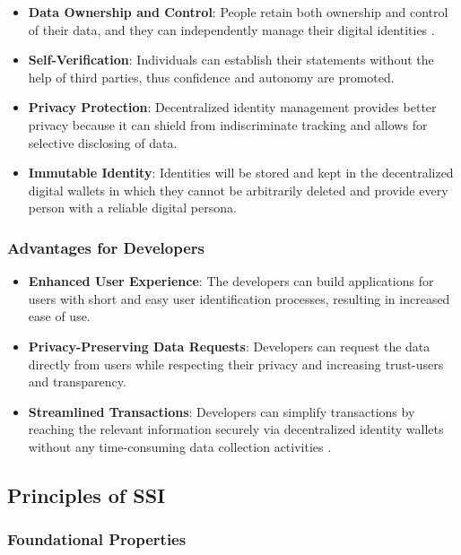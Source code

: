 \begin{itemize}
    \item \textbf{Data Ownership and Control}: People retain both ownership and control of their data, and they can independently manage their digital identities \cite{dockio}.
    \item \textbf{Self-Verification}: Individuals can establish their statements without the help of third parties, thus confidence and autonomy are promoted.
    \item \textbf{Privacy Protection}: Decentralized identity management provides better privacy because it can shield from indiscriminate tracking and allows for selective 
    disclosing of data.
    \item \textbf{Immutable Identity}: Identities will be stored and kept in the decentralized digital wallets in which they cannot be arbitrarily deleted and provide every 
    person with a reliable digital persona.
\end{itemize}

\subsubsection{Advantages for Developers}

\begin{itemize}
    \item \textbf{Enhanced User Experience}: The developers can build applications for users with short and easy user identification processes, resulting in increased ease of use.
    \item \textbf{Privacy-Preserving Data Requests}: Developers can request the data directly from users while respecting their privacy and increasing trust-users and transparency.
    \item \textbf{Streamlined Transactions}: Developers can simplify transactions by reaching the relevant information securely via decentralized identity wallets 
    without any time-consuming data collection activities \cite{dockio}.
\end{itemize}

\subsection{Principles of SSI }

\subsubsection{Foundational Properties}

